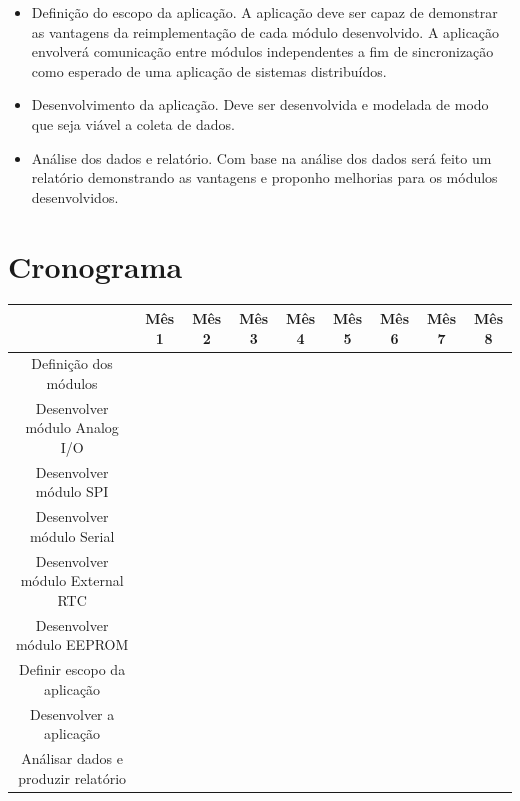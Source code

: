 \documentclass{article}
\begin{document}
\begin{itemize}
\item Definição do escopo da aplicação. A aplicação deve ser capaz de demonstrar as vantagens da
reimplementação de cada módulo desenvolvido. A aplicação envolverá comunicação entre
módulos independentes a fim de sincronização como esperado de uma aplicação de sistemas
distribuídos.
\item Desenvolvimento da aplicação. Deve ser desenvolvida e modelada de modo que seja viável a
coleta de dados.
\item Análise dos dados e relatório. Com base na análise dos dados será feito um relatório
demonstrando as vantagens e proponho melhorias para os módulos desenvolvidos.

\end{itemize}

\section{Cronograma}

\begin{center}
\begin{tabular}{|c|c|c|c|c|c|c|c|c|}
\hline
&Mês 1&Mês 2&Mês 3&Mês 4&Mês 5&Mês 6&Mês 7&Mês 8 \\
\hline
Definição dos módulos & \cellcolor[HTML]{808080} &&&&&&& \\
\hline
Desenvolver módulo Analog I/O & \cellcolor[HTML]{808080} & \cellcolor[HTML]{808080} &&&&&& \\
\hline
Desenvolver módulo SPI && \cellcolor[HTML]{808080} & \cellcolor[HTML]{808080} &&&&& \\
\hline
Desenvolver módulo Serial &&& \cellcolor[HTML]{808080} & \cellcolor[HTML]{808080} &&&& \\
\hline
Desenvolver módulo External RTC &&&& \cellcolor[HTML]{808080} & \cellcolor[HTML]{808080} &&& \\
\hline
Desenvolver módulo EEPROM &&&&& \cellcolor[HTML]{808080} & \cellcolor[HTML]{808080} && \\
\hline
Definir escopo da aplicação &&&&&& \cellcolor[HTML]{808080} && \\
\hline
Desenvolver a aplicação &&&&&&& \cellcolor[HTML]{808080} & \cellcolor[HTML]{808080}  \\
\hline
Análisar dados e produzir relatório &&&&&&&& \cellcolor[HTML]{808080}  \\
\hline
\end{tabular}
\end{center}

\newpage

\printbibliography
\end{document}
